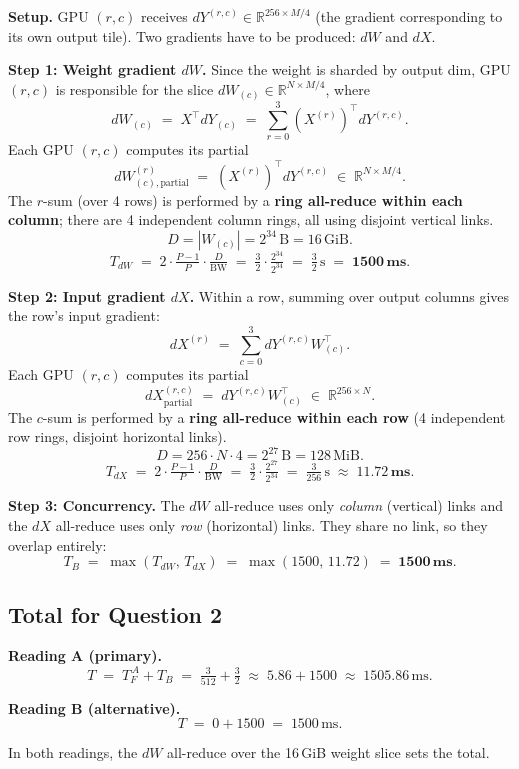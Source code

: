 \documentclass[11pt]{article}
\newcommand{\step}[1]{\noindent\textbf{#1}\quad}
\begin{document}
\begin{stepbox}
\step{Setup.}
GPU $(r,c)$ receives $dY^{(r,c)} \in \mathbb{R}^{256\times M/4}$
(the gradient corresponding to its own output tile).
Two gradients have to be produced: $dW$ and $dX$.

\medskip
\step{Step 1: Weight gradient $dW$.}
Since the weight is sharded by output dim, GPU $(r,c)$ is responsible for
the slice $dW_{(c)}\in\mathbb{R}^{N\times M/4}$, where
\[
    dW_{(c)} \;=\; X^{\top} dY_{(c)}
            \;=\; \sum_{r=0}^{3} (X^{(r)})^{\!\top} dY^{(r,c)}.
\]
Each GPU $(r,c)$ computes its partial
\[
    dW^{(r)}_{(c),\text{partial}} \;=\; (X^{(r)})^{\!\top} dY^{(r,c)}
    \;\in\;\mathbb{R}^{N\times M/4}.
\]
The $r$-sum (over 4 rows) is performed by a \textbf{ring all-reduce within
each column}; there are 4 independent column rings, all using disjoint
vertical links.
\[
    D = |W_{(c)}| = 2^{34}\,\text{B} = 16\,\text{GiB}.
\]
\[
    T_{dW}
    \;=\; 2\cdot\tfrac{P-1}{P}\cdot\tfrac{D}{\mathrm{BW}}
    \;=\; \tfrac{3}{2}\cdot\tfrac{2^{34}}{2^{34}}
    \;=\; \tfrac{3}{2}\,\text{s}
    \;=\; \mathbf{1500\,\text{ms}}.
\]

\medskip
\step{Step 2: Input gradient $dX$.}
Within a row, summing over output columns gives the row's input gradient:
\[
    dX^{(r)} \;=\; \sum_{c=0}^{3} dY^{(r,c)} W_{(c)}^{\top}.
\]
Each GPU $(r,c)$ computes its partial
\[
    dX^{(r,c)}_{\text{partial}} \;=\; dY^{(r,c)} W_{(c)}^{\top}
    \;\in\; \mathbb{R}^{256\times N}.
\]
The $c$-sum is performed by a \textbf{ring all-reduce within each row}
(4 independent row rings, disjoint horizontal links).
\[
    D = 256\cdot N\cdot 4 = 2^{27}\,\text{B} = 128\,\text{MiB}.
\]
\[
    T_{dX}
    \;=\; 2\cdot\tfrac{P-1}{P}\cdot\tfrac{D}{\mathrm{BW}}
    \;=\; \tfrac{3}{2}\cdot\tfrac{2^{27}}{2^{34}}
    \;=\; \tfrac{3}{256}\,\text{s}
    \;\approx\; \mathbf{11.72\,\text{ms}}.
\]

\medskip
\step{Step 3: Concurrency.}
The $dW$ all-reduce uses only \emph{column} (vertical) links and the $dX$
all-reduce uses only \emph{row} (horizontal) links. They share no link, so
they overlap entirely:
\[
    T_{B} \;=\; \max(T_{dW},\, T_{dX}) \;=\; \max(1500,\, 11.72) \;=\; \mathbf{1500\,\text{ms}}.
\]
\end{stepbox}

\subsection*{Total for Question 2}

\begin{stepbox}
\step{Reading A (primary).}
\[
    T \;=\; T_{F}^{\,A} + T_{B}
      \;=\; \tfrac{3}{512} + \tfrac{3}{2}
      \;\approx\; 5.86 + 1500
      \;\approx\; \boxed{1505.86\,\text{ms}}.
\]

\step{Reading B (alternative).}
\[
    T \;=\; 0 + 1500 \;=\; \boxed{1500\,\text{ms}}.
\]

In both readings, the $dW$ all-reduce over the 16\,GiB weight slice sets the total.
\end{stepbox}
\end{document}
